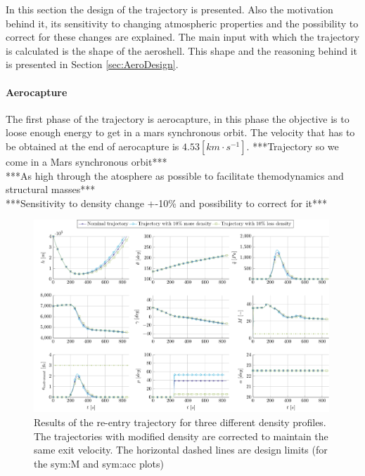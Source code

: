 In this section the design of the trajectory is presented. Also the motivation behind it, its sensitivity to changing atmospheric properties and the possibility to correct for these changes are explained. The main input with which the trajectory is calculated is the shape of the aeroshell. This shape and the reasoning behind it is presented in Section \ref{sec:AeroDesign}.

\paragraph{Aerocapture}
The first phase of the trajectory is aerocapture, in this phase the objective is to loose enough energy to get in a mars synchronous orbit. The velocity that has to be obtained at the end of aerocapture is $4.53 \left[km \cdot s^{-1}\right]$. 
***Trajectory so we come in a Mars synchronous orbit***\\
***As high through the atosphere as possible to facilitate themodynamics and structural masses***\\

***Sensitivity to density change +-10\% and possibility to correct for it***\\
\begin{figure}
	\centering
	\includegraphics[width=0.99\textwidth]{Figure/Orbit/sensitivity_aerocapture.pdf}
	\caption{ Results of the re-entry trajectory for three different density profiles. The trajectories with modified density are corrected to maintain the same exit velocity. The horizontal dashed lines are design limits (for the \gls{sym:M} and \gls{sym:acc} plots) }
	\label{fig:orbit_aerocapture_data}
\end{figure}

